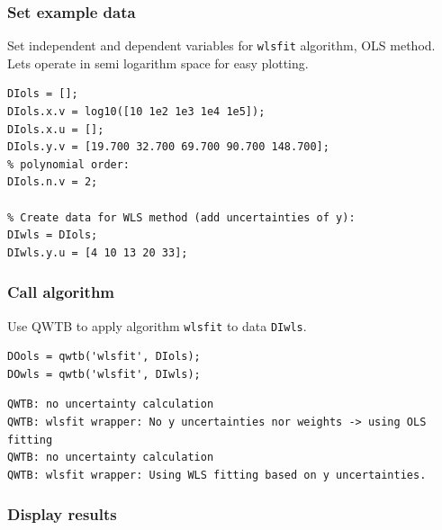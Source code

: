 \startcontents[localtoc]



{}
\subsubsection*{Set example data}



Set independent and dependent variables for \texttt{wlsfit} algorithm, OLS method.
Lets operate in semi logarithm space for easy plotting.

\begin{lstlisting}
DIols = [];
DIols.x.v = log10([10 1e2 1e3 1e4 1e5]);
DIols.x.u = [];
DIols.y.v = [19.700 32.700 69.700 90.700 148.700];
% polynomial order:
DIols.n.v = 2;

% Create data for WLS method (add uncertainties of y):
DIwls = DIols;
DIwls.y.u = [4 10 13 20 33];
\end{lstlisting}


{}
\subsubsection*{Call algorithm}



Use QWTB to apply algorithm \texttt{wlsfit} to data \texttt{DIwls}.

\begin{lstlisting}
DOols = qwtb('wlsfit', DIols);
DOwls = qwtb('wlsfit', DIwls);
\end{lstlisting}
\begin{lstlisting}[language={},xleftmargin=5pt,frame=none]
QWTB: no uncertainty calculation
QWTB: wlsfit wrapper: No y uncertainties nor weights -> using OLS fitting
QWTB: no uncertainty calculation
QWTB: wlsfit wrapper: Using WLS fitting based on y uncertainties.

\end{lstlisting}


{}
\subsubsection*{Display results}



